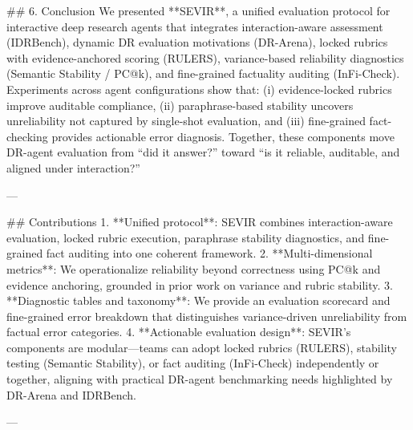 ## 6. Conclusion  
We presented **SEVIR**, a unified evaluation protocol for interactive deep research agents that integrates interaction-aware assessment (IDRBench), dynamic DR evaluation motivations (DR-Arena), locked rubrics with evidence-anchored scoring (RULERS), variance-based reliability diagnostics (Semantic Stability / PC@k), and fine-grained factuality auditing (InFi-Check). Experiments across agent configurations show that: (i) evidence-locked rubrics improve auditable compliance, (ii) paraphrase-based stability uncovers unreliability not captured by single-shot evaluation, and (iii) fine-grained fact-checking provides actionable error diagnosis. Together, these components move DR-agent evaluation from “did it answer?” toward “is it reliable, auditable, and aligned under interaction?”

---

## Contributions  
1. **Unified protocol**: SEVIR combines interaction-aware evaluation, locked rubric execution, paraphrase stability diagnostics, and fine-grained fact auditing into one coherent framework.  
2. **Multi-dimensional metrics**: We operationalize reliability beyond correctness using PC@k and evidence anchoring, grounded in prior work on variance and rubric stability.  
3. **Diagnostic tables and taxonomy**: We provide an evaluation scorecard and fine-grained error breakdown that distinguishes variance-driven unreliability from factual error categories.  
4. **Actionable evaluation design**: SEVIR’s components are modular—teams can adopt locked rubrics (RULERS), stability testing (Semantic Stability), or fact auditing (InFi-Check) independently or together, aligning with practical DR-agent benchmarking needs highlighted by DR-Arena and IDRBench.

---